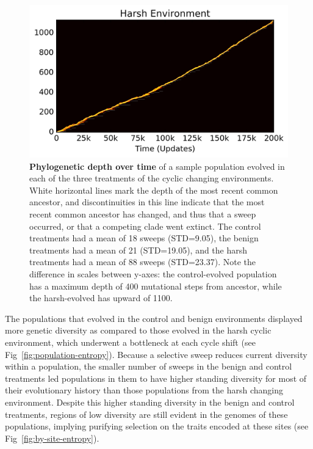 \documentclass[10pt,letterpaper]{article}
\begin{document}
\begin{figure}[!h]
	\includegraphics[trim={-0.63cm 0 0.25cm 0},clip,width=0.65\columnwidth]{figures/CE/harsh__phylodepth_with_coalescense.png}
	\caption{\textbf{Phylogenetic depth over time} of a sample population evolved in each of the three treatments of the cyclic changing environments. White horizontal lines mark the depth of the most recent common ancestor, and discontinuities in this line indicate that the most recent common ancestor has changed, and thus that a sweep occurred, or that a competing clade went extinct. The control treatments had a mean of 18 sweeps (STD=9.05), the benign treatments had a mean of 21 (STD=19.05), and the harsh treatments had a mean of 88 sweeps (STD=23.37). Note the difference in scales between y-axes: the control-evolved population has a maximum depth of 400 mutational steps from ancestor, while the harsh-evolved has upward of 1100. %
	}\label{fig:flamegraph}
	\end{figure}

The populations that evolved in the control and benign environments displayed more genetic diversity as compared to those evolved in the harsh cyclic environment, which underwent a bottleneck at each cycle shift (see Fig~\ref{fig:population-entropy}). Because a selective sweep reduces current diversity within a population, the smaller number of sweeps
in the benign and control treatments led populations in them to have higher standing diversity for most of their evolutionary history than those populations from the harsh changing environment. Despite this higher standing diversity in the benign and control treatments, regions of low diversity are still evident in the genomes of these populations, implying purifying selection on the traits encoded at these sites (see Fig~\ref{fig:by-site-entropy}).
%
%
\end{document}
